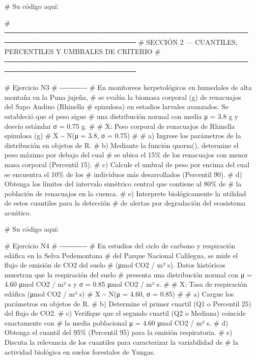 \documentclass[
  spanish,
  letterpaper,
  DIV=11,
  numbers=noendperiod]{scrreprt}
\newenvironment{Shaded}{\begin{snugshade}}{\end{snugshade}}
\newcommand{\CommentTok}[1]{\textcolor[rgb]{0.37,0.37,0.37}{#1}}
\begin{document}
\begin{Shaded}
\begin{Highlighting}[]
\CommentTok{\# Su código aquí:}


\CommentTok{\# ─────────────────────────────────────────────────────────────────────────────}
\CommentTok{\#  SECCIÓN 2 — CUANTILES, PERCENTILES Y UMBRALES DE CRITERIO}
\CommentTok{\# ─────────────────────────────────────────────────────────────────────────────}

\CommentTok{\# Ejercicio N3}
\CommentTok{\# {-}{-}{-}{-}{-}{-}{-}{-}{-}{-}{-}{-}}
\CommentTok{\# En monitoreos herpetológicos en humedales de alta montaña en la Puna jujeña,}
\CommentTok{\# se evalúa la biomasa corporal (g) de renacuajos del Sapo Andino (Rhinella}
\CommentTok{\# spinulosa) en estadios larvales avanzados. Se estableció que el peso sigue}
\CommentTok{\# una distribución normal con media μ = 3.8 g y desvío estándar σ = 0.75 g.}
\CommentTok{\#}
\CommentTok{\#  X: Peso corporal de renacuajos de Rhinella spinulosa (g)}
\CommentTok{\#  X \textasciitilde{} N(μ = 3.8, σ = 0.75)}
\CommentTok{\#}
\CommentTok{\# a) Ingrese los parámetros de la distribución en objetos de R.}
\CommentTok{\# b) Mediante la función qnorm(), determine el peso máximo por debajo del cual}
\CommentTok{\#    se ubica el 15\% de los renacuajos con menor masa corporal (Percentil 15).}
\CommentTok{\# c) Calcule el umbral de peso por encima del cual se encuentra el 10\% de los}
\CommentTok{\#    individuos más desarrollados (Percentil 90).}
\CommentTok{\# d) Obtenga los límites del intervalo simétrico central que contiene al 80\% de}
\CommentTok{\#    la población de renacuajos en la cuenca.}
\CommentTok{\# e) Interprete biológicamente la utilidad de estos cuantiles para la detección}
\CommentTok{\#    de alertas por degradación del ecosistema acuático.}

\CommentTok{\# Su código aquí:}


\CommentTok{\# Ejercicio N4}
\CommentTok{\# {-}{-}{-}{-}{-}{-}{-}{-}{-}{-}{-}{-}}
\CommentTok{\# En estudios del ciclo de carbono y respiración edáfica en la Selva Pedemontana}
\CommentTok{\# del Parque Nacional Calilegua, se mide el flujo de emisión de CO2 del suelo}
\CommentTok{\# (μmol CO2 / m² s). Datos históricos muestran que la respiración del suelo}
\CommentTok{\# presenta una distribución normal con μ = 4.60 μmol CO2 / m² s y σ = 0.85 μmol CO2 / m² s.}
\CommentTok{\#}
\CommentTok{\#  X: Tasa de respiración edáfica (μmol CO2 / m² s)}
\CommentTok{\#  X \textasciitilde{} N(μ = 4.60, σ = 0.85)}
\CommentTok{\#}
\CommentTok{\# a) Cargue los parámetros en objetos de R.}
\CommentTok{\# b) Determine el primer cuartil (Q1 o Percentil 25) del flujo de CO2.}
\CommentTok{\# c) Verifique que el segundo cuartil (Q2 o Mediana) coincide exactamente con}
\CommentTok{\#    la media poblacional μ = 4.60 μmol CO2 / m² s.}
\CommentTok{\# d) Obtenga el cuantil del 95\% (Percentil 95) para la emisión respiratoria.}
\CommentTok{\# e) Discuta la relevancia de los cuantiles para caracterizar la variabilidad de}
\CommentTok{\#    la actividad biológica en suelos forestales de Yungas.}


\end{Highlighting}
\end{Shaded}
\end{document}
